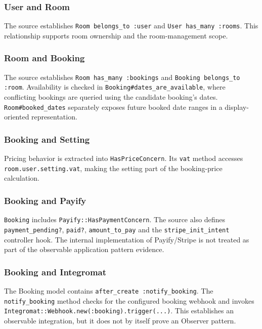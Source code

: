 \documentclass[10pt,a4paper]{article}
\newcommand{\code}[1]{\texttt{\small #1}}
\begin{document}
\subsubsection{User and Room}

The source establishes \code{Room belongs\_to :user} and \code{User has\_many :rooms}. This relationship supports room ownership and the room-management scope.

\subsubsection{Room and Booking}

The source establishes \code{Room has\_many :bookings} and \code{Booking belongs\_to :room}. Availability is checked in \code{Booking\#dates\_are\_available}, where conflicting bookings are queried using the candidate booking's dates. \code{Room\#booked\_dates} separately exposes future booked date ranges in a display-oriented representation.

\subsubsection{Booking and Setting}

Pricing behavior is extracted into \code{HasPriceConcern}. Its \code{vat} method accesses \code{room.user.setting.vat}, making the setting part of the booking-price calculation.

\subsubsection{Booking and Payify}

\code{Booking} includes \code{Payify::HasPaymentConcern}. The source also defines \code{payment\_pending?}, \code{paid?}, \code{amount\_to\_pay} and the \code{stripe\_init\_intent} controller hook. The internal implementation of Payify/Stripe is not treated as part of the observable application pattern evidence.

\subsubsection{Booking and Integromat}

The Booking model contains \code{after\_create :notify\_booking}. The \code{notify\_booking} method checks for the configured booking webhook and invokes \code{Integromat::Webhook.new(:booking).trigger(...)}. This establishes an observable integration, but it does not by itself prove an Observer pattern.
\end{document}
